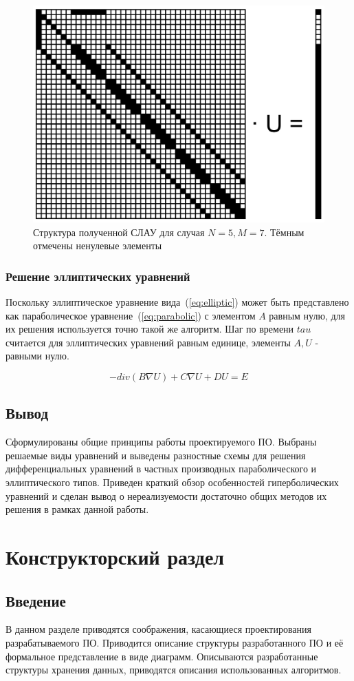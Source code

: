 \begin{figure}
    \centering
    \includegraphics[width=0.4\linewidth]{img/matrix/matrix}
    \caption{Структура полученной СЛАУ для случая $N=5, M=7$. Тёмным отмечены 
    ненулевые элементы}
    \label{fig:matrix}
\end{figure}

\subsubsection{Решение эллиптических уравнений}\label{sec:elliptic-scheme}
Поскольку эллиптическое уравнение вида~(\ref{eq:elliptic}) может быть 
представлено как параболическое уравнение~(\ref{eq:parabolic}) с элементом $A$ 
равным нулю, для их решения используется точно такой же алгоритм. Шаг по 
времени $tau$ считается для эллиптических уравнений равным единице, элементы 
$A, U$ - равными нулю.

\begin{equation}
- div(B \nabla U) + C \nabla U + D U = E
\label{eq:elliptic}
\end{equation}

\subsection{Вывод}
Сформулированы общие принципы работы проектируемого ПО. Выбраны 
решаемые виды уравнений и выведены разностные схемы для решения 
дифференциальных уравнений в частных производных параболического и 
эллиптического типов. Приведен краткий обзор особенностей гиперболических 
уравнений и сделан вывод о нереализуемости достаточно общих методов их решения 
в рамках данной работы.

\section{Конструкторский раздел}
\subsection{Введение}
В данном разделе приводятся соображения, касающиеся проектирования 
разрабатываемого ПО. Приводится описание структуры разработанного ПО и её 
формальное представление в виде диаграмм. Описываются разработанные структуры 
хранения данных, приводятся описания использованных алгоритмов.

